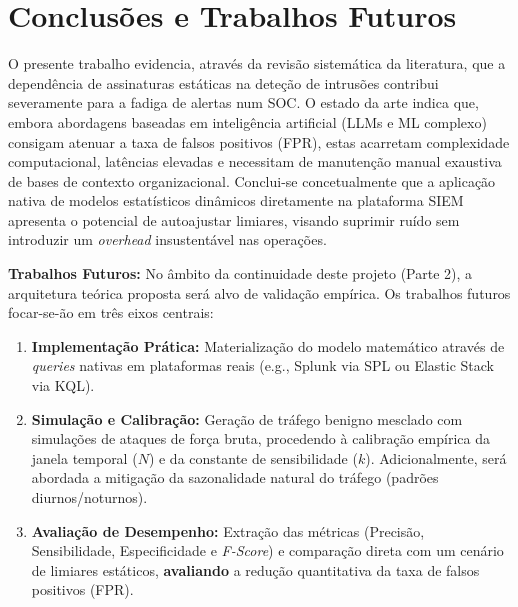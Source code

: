 \documentclass[12pt,a4paper]{article}
\begin{document}
\section{Conclusões e Trabalhos Futuros}
O presente trabalho evidencia, através da revisão sistemática da literatura, que a dependência de assinaturas estáticas na deteção de intrusões contribui severamente para a fadiga de alertas num SOC. O estado da arte indica que, embora abordagens baseadas em inteligência artificial (LLMs e ML complexo) consigam atenuar a taxa de falsos positivos (FPR), estas acarretam complexidade computacional, latências elevadas e necessitam de manutenção manual exaustiva de bases de contexto organizacional. Conclui-se concetualmente que a aplicação nativa de modelos estatísticos dinâmicos diretamente na plataforma SIEM apresenta o potencial de autoajustar limiares, visando suprimir ruído sem introduzir um \textit{overhead} insustentável nas operações.

\textbf{Trabalhos Futuros:}
No âmbito da continuidade deste projeto (Parte 2), a arquitetura teórica proposta será alvo de validação empírica. Os trabalhos futuros focar-se-ão em três eixos centrais:
\begin{enumerate}
    \item \textbf{Implementação Prática:} Materialização do modelo matemático através de \textit{queries} nativas em plataformas reais (e.g., Splunk via SPL ou Elastic Stack via KQL).
    \item \textbf{Simulação e Calibração:} Geração de tráfego benigno mesclado com simulações de ataques de força bruta, procedendo à calibração empírica da janela temporal ($N$) e da constante de sensibilidade ($k$). Adicionalmente, será abordada a mitigação da sazonalidade natural do tráfego (padrões diurnos/noturnos).
    \item \textbf{Avaliação de Desempenho:} Extração das métricas (Precisão, Sensibilidade, Especificidade e \textit{F-Score}) e comparação direta com um cenário de limiares estáticos, \textbf{avaliando} a redução quantitativa da taxa de falsos positivos (FPR).
\end{enumerate}
\end{document}
